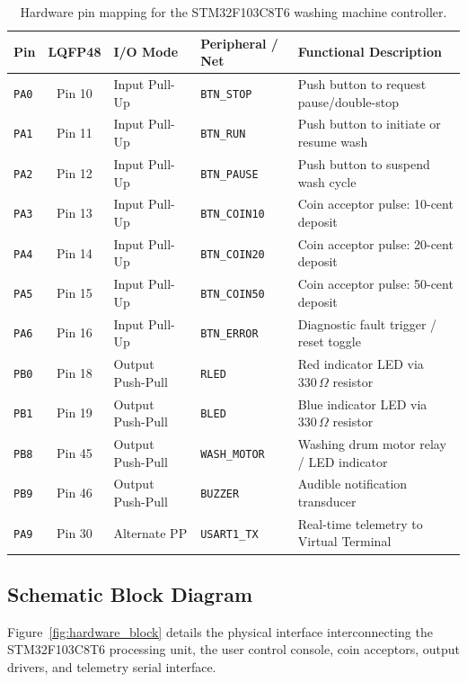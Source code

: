 \documentclass[12pt]{article}
\begin{document}
\begin{table}[H]
\centering
\small
\renewcommand{\arraystretch}{1.25}
\begin{tabularx}{\textwidth}{l c l l X}
\toprule
\textbf{Pin} & \textbf{LQFP48} & \textbf{I/O Mode} & \textbf{Peripheral / Net} & \textbf{Functional Description} \\
\midrule
\texttt{PA0} & Pin 10 & Input Pull-Up   & \texttt{BTN\_STOP}     & Push button to request pause/double-stop \\
\texttt{PA1} & Pin 11 & Input Pull-Up   & \texttt{BTN\_RUN}      & Push button to initiate or resume wash \\
\texttt{PA2} & Pin 12 & Input Pull-Up   & \texttt{BTN\_PAUSE}    & Push button to suspend wash cycle \\
\texttt{PA3} & Pin 13 & Input Pull-Up   & \texttt{BTN\_COIN10}   & Coin acceptor pulse: 10-cent deposit \\
\texttt{PA4} & Pin 14 & Input Pull-Up   & \texttt{BTN\_COIN20}   & Coin acceptor pulse: 20-cent deposit \\
\texttt{PA5} & Pin 15 & Input Pull-Up   & \texttt{BTN\_COIN50}   & Coin acceptor pulse: 50-cent deposit \\
\texttt{PA6} & Pin 16 & Input Pull-Up   & \texttt{BTN\_ERROR}    & Diagnostic fault trigger / reset toggle \\
\texttt{PB0} & Pin 18 & Output Push-Pull & \texttt{RLED}          & Red indicator LED via $330\,\Omega$ resistor \\
\texttt{PB1} & Pin 19 & Output Push-Pull & \texttt{BLED}          & Blue indicator LED via $330\,\Omega$ resistor \\
\texttt{PB8} & Pin 45 & Output Push-Pull & \texttt{WASH\_MOTOR}   & Washing drum motor relay / LED indicator \\
\texttt{PB9} & Pin 46 & Output Push-Pull & \texttt{BUZZER}        & Audible notification transducer \\
\texttt{PA9} & Pin 30 & Alternate PP    & \texttt{USART1\_TX}    & Real-time telemetry to Virtual Terminal \\
\bottomrule
\end{tabularx}
\caption{Hardware pin mapping for the STM32F103C8T6 washing machine controller.}
\label{tab:pinout}
\end{table}

\subsection{Schematic Block Diagram}
Figure~\ref{fig:hardware_block} details the physical interface interconnecting the STM32F103C8T6 processing unit, the user control console, coin acceptors, output drivers, and telemetry serial interface.
\end{document}
